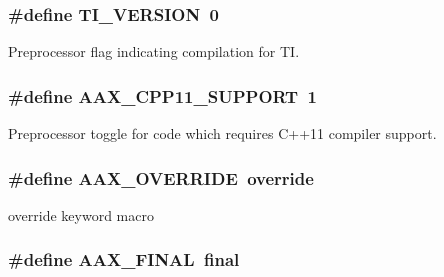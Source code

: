 \subsubsection[{T\+I\+\_\+\+V\+E\+R\+S\+I\+O\+N}]{\setlength{\rightskip}{0pt plus 5cm}\#define T\+I\+\_\+\+V\+E\+R\+S\+I\+O\+N~0}\label{a00149_a5f58f7770d463d262cc28b0e7b88747b}


Preprocessor flag indicating compilation for T\+I. 

\hypertarget{a00149_a2da185ff8aad77278f985a6fe5ee07ba}{}
\subsubsection[{A\+A\+X\+\_\+\+C\+P\+P11\+\_\+\+S\+U\+P\+P\+O\+R\+T}]{\setlength{\rightskip}{0pt plus 5cm}\#define A\+A\+X\+\_\+\+C\+P\+P11\+\_\+\+S\+U\+P\+P\+O\+R\+T~1}\label{a00149_a2da185ff8aad77278f985a6fe5ee07ba}


Preprocessor toggle for code which requires C++11 compiler support. 

\hypertarget{a00149_ac2f24a5172689ae684344abdcce55463}{}
\subsubsection[{A\+A\+X\+\_\+\+O\+V\+E\+R\+R\+I\+D\+E}]{\setlength{\rightskip}{0pt plus 5cm}\#define A\+A\+X\+\_\+\+O\+V\+E\+R\+R\+I\+D\+E~override}\label{a00149_ac2f24a5172689ae684344abdcce55463}


{\ttfamily override} keyword macro 

\hypertarget{a00149_aa4da4a09e940c332a2205e34e0677f40}{}
\subsubsection[{A\+A\+X\+\_\+\+F\+I\+N\+A\+L}]{\setlength{\rightskip}{0pt plus 5cm}\#define A\+A\+X\+\_\+\+F\+I\+N\+A\+L~final}\label{a00149_aa4da4a09e940c332a2205e34e0677f40}


